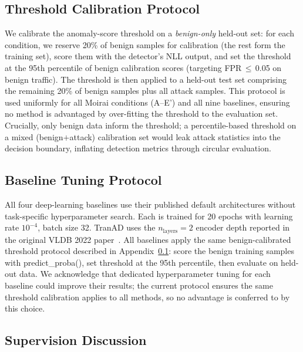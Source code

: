 \subsection{Threshold Calibration Protocol}
\label{app:threshold}

We calibrate the anomaly-score threshold on a \emph{benign-only} held-out
set: for each condition, we reserve 20\% of benign samples for calibration
(the rest form the training set), score them with the detector's NLL output,
and set the threshold at the 95th percentile of benign calibration scores
(targeting FPR\,$\leq$\,0.05 on benign traffic).
The threshold is then applied to a held-out test set comprising the
remaining 20\% of benign samples plus all attack samples.
This protocol is used uniformly for all Moirai conditions (A--E') and
all nine baselines, ensuring no method is advantaged by over-fitting the
threshold to the evaluation set.
Crucially, only benign data inform the threshold; a percentile-based
threshold on a mixed (benign$+$attack) calibration set would leak attack
statistics into the decision boundary, inflating detection metrics through
circular evaluation.

\subsection{Baseline Tuning Protocol}
\label{app:baseline_tuning}

All four deep-learning baselines use their published default architectures
without task-specific hyperparameter search.
Each is trained for 20 epochs with learning rate $10^{-4}$, batch size 32.
TranAD uses the $n_\text{layers}=2$ encoder depth reported in the original
VLDB 2022 paper~\cite{tuli2022tranad}.
All baselines apply the same benign-calibrated threshold protocol
described in Appendix~\ref{app:threshold}: score the benign training samples
with predict\_proba(), set threshold at the 95th percentile, then evaluate
on held-out data.
We acknowledge that dedicated hyperparameter tuning for each baseline
could improve their results; the current protocol ensures the same
threshold calibration applies to all methods, so no advantage
is conferred to \ours{} by this choice.

\subsection{Supervision Discussion}
\label{app:supervision}


